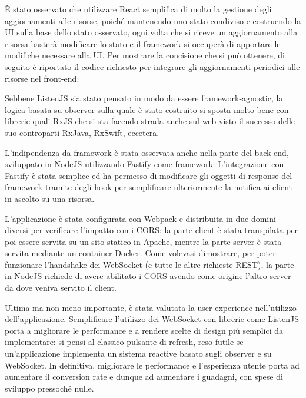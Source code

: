 \documentclass[12pt,a4paper,openright,twoside]{report}
\begin{document}
È stato osservato che utilizzare React semplifica di molto la gestione degli aggiornamenti alle risorse, poiché mantenendo uno stato condiviso e costruendo la UI sulla base dello stato osservato, ogni volta che si riceve un aggiornamento alla risorsa basterà modificare lo stato e il framework si occuperà di apportare le modifiche necessare alla UI. Per mostrare la concisione che si può ottenere, di seguito è riportato il codice richiesto per integrare gli aggiornamenti periodici alle risorse nel front-end:

Sebbene ListenJS sia stato pensato in modo da essere framework-agnostic, la logica basata su observer sulla quale è stato costruito si sposta molto bene con librerie quali RxJS che si sta facendo strada anche sul web visto il successo delle suo controparti RxJava, RxSwift, eccetera.

\bigskip

L'indipendenza da framework è stata osservata anche nella parte del back-end, sviluppato in NodeJS\cite{nodejs} utilizzando Fastify\cite{fastify} come framework. L'integrazione con Fastify è stata semplice ed ha permesso di modificare gli oggetti di response del framework tramite degli hook per semplificare ulteriormente la notifica ai client in ascolto su una risorsa.


L'applicazione è stata configurata con Webpack\cite{webpack} e distribuita in due domini diversi per verificare l'impatto con i CORS: la parte client è stata transpilata per poi essere servita su un sito statico in Apache, mentre la parte server è stata servita mediante un container Docker. Come volevasi dimostrare, per poter funzionare l'handshake dei WebSocket (e tutte le altre richieste REST), la parte in NodeJS richiede di avere abilitato i CORS avendo come origine l'altro server da dove veniva servito il client.

\bigskip

Ultima ma non meno importante, è stata valutata la user experience nell'utilizzo dell'applicazione. Semplificare l'utilizzo dei WebSocket con librerie come ListenJS porta a migliorare le performance e a rendere scelte di design più semplici da implementare: si pensi al classico pulsante di refresh, reso futile se un'applicazione implementa un sistema reactive basato sugli observer e su WebSocket. In definitiva, migliorare le performance e l'esperienza utente porta ad aumentare il conversion rate\cite{why_performance_matters} e dunque ad aumentare i guadagni, con spese di sviluppo pressoché nulle.
\end{document}
